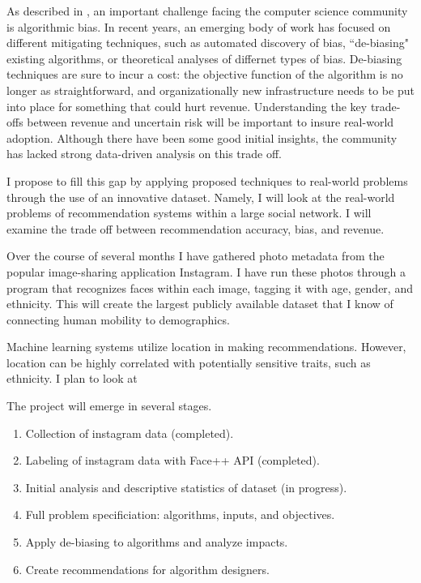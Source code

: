 
As described in , an important challenge facing the computer science community is algorithmic bias.
In recent years, an emerging body of work has focused on different mitigating techniques, 
  such as automated discovery of bias, ``de-biasing" existing algorithms, or theoretical analyses of differnet types of bias.
De-biasing techniques are sure to incur a cost: the objective function of the algorithm is no longer as straightforward, and organizationally new infrastructure needs to be put into place for something that could hurt revenue.
Understanding the key trade-offs between revenue and uncertain risk will be important to insure real-world adoption.
Although there have been some good initial insights, the community has lacked strong data-driven analysis on this trade off.

I propose to fill this gap by applying proposed techniques to real-world problems through the use of an innovative dataset.
Namely, I will look at the real-world problems of recommendation systems within a large social network.
I will examine the trade off between recommendation accuracy, bias, and revenue.

Over the course of several months I have gathered photo metadata from the popular image-sharing application Instagram.
I have run these photos through a program that recognizes faces within each image, tagging it with age, gender, and ethnicity.
This will create the largest publicly available dataset that I know of connecting human mobility to demographics.

Machine learning systems utilize location in making recommendations.
However, location can be highly correlated with potentially sensitive traits, such as ethnicity.
I plan to look at 


The project will emerge in several stages.
\begin{enumerate}
  \item Collection of instagram data (completed).
  \item Labeling of instagram data with Face++ API (completed).
  \item Initial analysis and descriptive statistics of dataset (in progress).
  \item Full problem specificiation: algorithms, inputs, and objectives.
  \item Apply de-biasing to algorithms and analyze impacts.
  \item Create recommendations for algorithm designers.
\end{enumerate}
